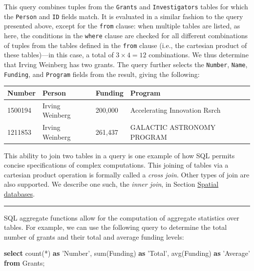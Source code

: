 \documentclass[]{krantz}
\newenvironment{Shaded}{\begin{snugshade}}{\end{snugshade}}
\newcommand{\KeywordTok}[1]{\textcolor[rgb]{0.13,0.29,0.53}{\textbf{#1}}}
\newcommand{\StringTok}[1]{\textcolor[rgb]{0.31,0.60,0.02}{#1}}
\newcommand{\FunctionTok}[1]{\textcolor[rgb]{0.00,0.00,0.00}{#1}}
\newcommand{\NormalTok}[1]{#1}
\begin{document}
This query combines tuples from the \texttt{Grants} and
\texttt{Investigators} tables for which the \texttt{Person} and
\texttt{ID} fields match. It is evaluated in a similar fashion to the
query presented above, except for the \texttt{from} clause: when
multiple tables are listed, as here, the conditions in the
\texttt{where} clause are checked for all different combinations of
tuples from the tables defined in the \texttt{from} clause (i.e., the
cartesian product of these tables)---in this case, a total of
\(3\times 4 = 12\) combinations. We thus determine that Irving Weinberg
has two grants. The query further selects the \texttt{Number},
\texttt{Name}, \texttt{Funding}, and \texttt{Program} fields from the
result, giving the following:

\begin{longtable}[]{@{}llll@{}}
\toprule
\textbf{Number} & \textbf{Person} & \textbf{Funding} &
\textbf{Program}\tabularnewline
\midrule
\endhead
1500194 & Irving Weinberg & 200,000 & Accelerating Innovation
Rsrch\tabularnewline
1211853 & Irving Weinberg & 261,437 & GALACTIC ASTRONOMY
PROGRAM\tabularnewline
\bottomrule
\end{longtable}

This ability to join two tables in a query is one example of how SQL
permits concise specifications of complex computations. This joining of
tables via a cartesian product operation is formally called a
\emph{cross join}. Other types of join are also supported. We describe
one such, the \emph{inner join}, in Section
\protect\hyperlink{sec:db:spatial}{Spatial databases}.

\begin{center}\rule{0.5\linewidth}{\linethickness}\end{center}

SQL aggregate functions allow for the computation of aggregate
statistics over tables. For example, we can use the following query to
determine the total number of grants and their total and average funding
levels:

\begin{Shaded}
\begin{Highlighting}[]
\KeywordTok{select} \FunctionTok{count}\NormalTok{(*) }\KeywordTok{as} \StringTok{'Number'}\NormalTok{, }\FunctionTok{sum}\NormalTok{(Funding) }\KeywordTok{as} \StringTok{'Total'}\NormalTok{,}
       \FunctionTok{avg}\NormalTok{(Funding) }\KeywordTok{as} \StringTok{'Average'}
\KeywordTok{from}\NormalTok{ Grants;}
\end{Highlighting}
\end{Shaded}
\end{document}
